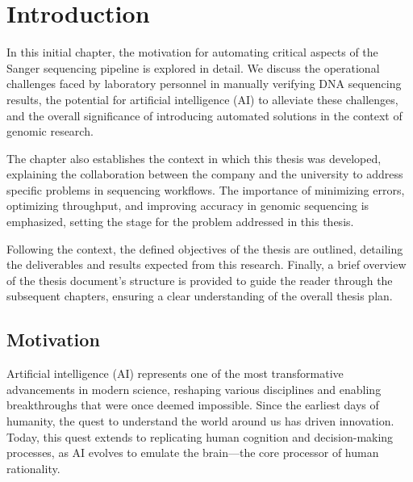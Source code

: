 
%

\chapter{Introduction}
\label{cha:Introduction}


In this initial chapter, the motivation for automating critical aspects of the Sanger sequencing pipeline is explored in detail. We discuss the operational challenges faced by laboratory personnel in manually verifying DNA sequencing results, the potential for artificial intelligence (AI) to alleviate these challenges, and the overall significance of introducing automated solutions in the context of genomic research.

The chapter also establishes the context in which this thesis was developed, explaining the collaboration between the company and the university to address specific problems in sequencing workflows. The importance of minimizing errors, optimizing throughput, and improving accuracy in genomic sequencing is emphasized, setting the stage for the problem addressed in this thesis.

Following the context, the defined objectives of the thesis are outlined, detailing the deliverables and results expected from this research. Finally, a brief overview of the thesis document's structure is provided to guide the reader through the subsequent chapters, ensuring a clear understanding of the overall thesis plan.

\section{Motivation}
\label{sec:Motivation}

Artificial intelligence (AI) represents one of the most transformative advancements in modern science, reshaping various disciplines and enabling breakthroughs that were once deemed impossible. Since the earliest days of humanity, the quest to understand the world around us has driven innovation. Today, this quest extends to replicating human cognition and decision-making processes, as AI evolves to emulate the brain—the core processor of human rationality.

